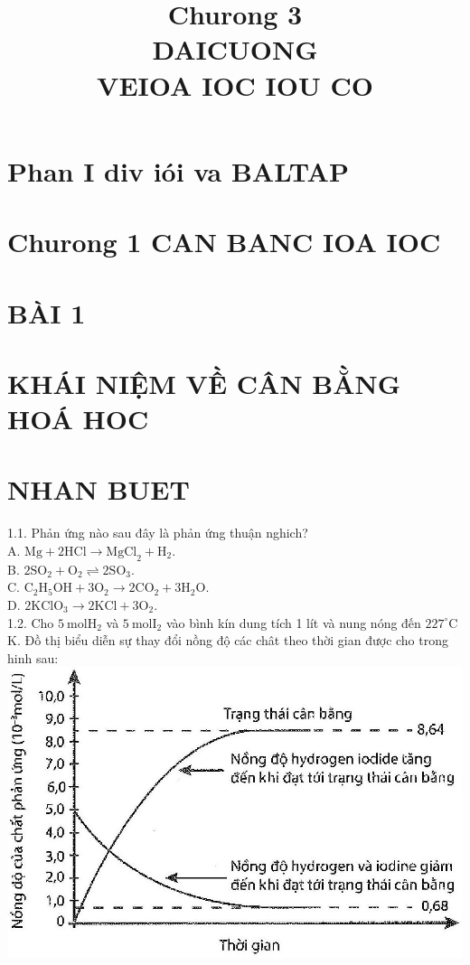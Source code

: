 \documentclass[10pt]{article}
\title{Churong 3 \\
 DAICUONG \\
 VEIOA IOC IOU CO }
\author{}
\date{}
\begin{document}
\maketitle
\captionsetup{singlelinecheck=false}
\section*{Phan I div iói va BALTAP}
\section*{Churong 1 CAN BANC IOA IOC}
\section*{BÀI 1}
\section*{KHÁI NIỆM VỀ CÂN BẰNG HOÁ HOC}
\section*{NHAN BUET}
1.1. Phản ứng nào sau đây là phản ứng thuận nghich?\\
A. $\mathrm{Mg}+2 \mathrm{HCl} \longrightarrow \mathrm{MgCl}_{2}+\mathrm{H}_{2}$.\\
B. $2 \mathrm{SO}_{2}+\mathrm{O}_{2} \rightleftharpoons 2 \mathrm{SO}_{3}$.\\
C. $\mathrm{C}_{2} \mathrm{H}_{5} \mathrm{OH}+3 \mathrm{O}_{2} \longrightarrow 2 \mathrm{CO}_{2}+3 \mathrm{H}_{2} \mathrm{O}$.\\
D. $2 \mathrm{KClO}_{3} \longrightarrow 2 \mathrm{KCl}+3 \mathrm{O}_{2}$.\\
1.2. Cho $5 \mathrm{~mol} \mathrm{H}_{2}$ và $5 \mathrm{~mol} \mathrm{I}_{2}$ vào bình kín dung tích 1 lít và nung nóng đến $227^{\circ} \mathrm{C}$ K. Đồ thị biểu diễn sự thay đổi nồng độ các chât theo thời gian được cho trong hinh sau:\\
\includegraphics[max width=\textwidth, center]{2025_10_23_fa9073eecee116ad8cf2g-01}
\end{document}

